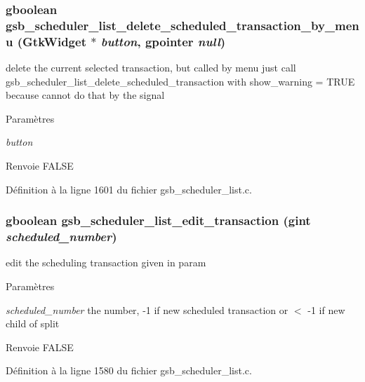 \subsubsection[{gsb\_\-scheduler\_\-list\_\-delete\_\-scheduled\_\-transaction\_\-by\_\-menu}]{\setlength{\rightskip}{0pt plus 5cm}gboolean gsb\_\-scheduler\_\-list\_\-delete\_\-scheduled\_\-transaction\_\-by\_\-menu (GtkWidget $\ast$ {\em button}, \/  gpointer {\em null})}\label{gsb__scheduler__list_8h_ad3d815d7983018de7999d778590f17dc}
delete the current selected transaction, but called by menu just call gsb\_\-scheduler\_\-list\_\-delete\_\-scheduled\_\-transaction with show\_\-warning = TRUE because cannot do that by the signal


\begin{DoxyParams}{Paramètres}
\item[{\em button}]\end{DoxyParams}
\begin{DoxyReturn}{Renvoie}
FALSE 
\end{DoxyReturn}


Définition à la ligne 1601 du fichier gsb\_\-scheduler\_\-list.c.

\subsubsection[{gsb\_\-scheduler\_\-list\_\-edit\_\-transaction}]{\setlength{\rightskip}{0pt plus 5cm}gboolean gsb\_\-scheduler\_\-list\_\-edit\_\-transaction (gint {\em scheduled\_\-number})}\label{gsb__scheduler__list_8h_a10a206d10ab971adb3ea36ec263c34d2}
edit the scheduling transaction given in param


\begin{DoxyParams}{Paramètres}
\item[{\em scheduled\_\-number}]the number, -\/1 if new scheduled transaction or $<$ -\/1 if new child of split\end{DoxyParams}
\begin{DoxyReturn}{Renvoie}
FALSE 
\end{DoxyReturn}


Définition à la ligne 1580 du fichier gsb\_\-scheduler\_\-list.c.

